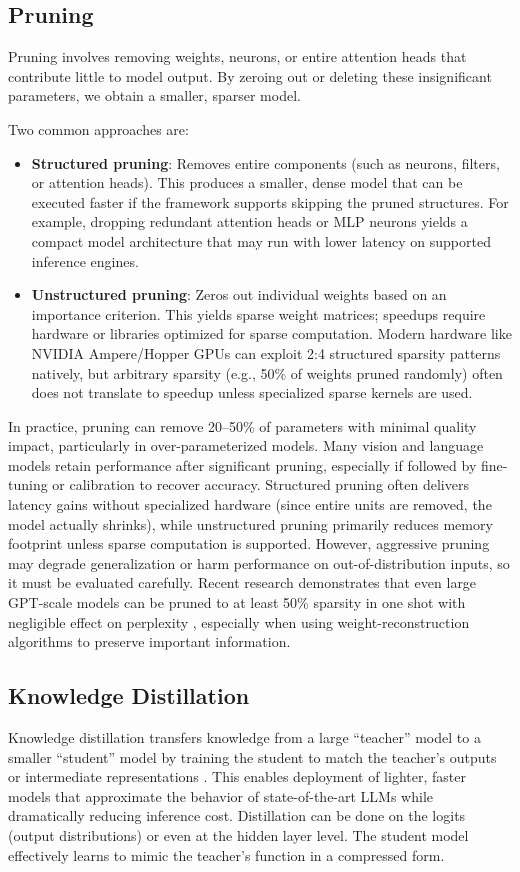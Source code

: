 \subsection{Pruning}
Pruning involves removing weights, neurons, or entire attention heads that contribute little to model output. By zeroing out or deleting these insignificant parameters, we obtain a smaller, sparser model.

Two common approaches are:
\begin{itemize}
    \item \textbf{Structured pruning}: Removes entire components (such as neurons, filters, or attention heads). This produces a smaller, dense model that can be executed faster if the framework supports skipping the pruned structures. For example, dropping redundant attention heads or MLP neurons yields a compact model architecture that may run with lower latency on supported inference engines.
    \item \textbf{Unstructured pruning}: Zeros out individual weights based on an importance criterion. This yields sparse weight matrices; speedups require hardware or libraries optimized for sparse computation. Modern hardware like NVIDIA Ampere/Hopper GPUs can exploit 2:4 structured sparsity patterns natively, but arbitrary sparsity (e.g., 50\% of weights pruned randomly) often does not translate to speedup unless specialized sparse kernels are used.
\end{itemize}

In practice, pruning can remove 20--50\% of parameters with minimal quality impact, particularly in over-parameterized models. Many vision and language models retain performance after significant pruning, especially if followed by fine-tuning or calibration to recover accuracy. Structured pruning often delivers latency gains without specialized hardware (since entire units are removed, the model actually shrinks), while unstructured pruning primarily reduces memory footprint unless sparse computation is supported. However, aggressive pruning may degrade generalization or harm performance on out-of-distribution inputs, so it must be evaluated carefully. Recent research demonstrates that even large GPT-scale models can be pruned to at least 50\% sparsity in one shot with negligible effect on perplexity \cite{Frantar2023SparseGPT}, especially when using weight-reconstruction algorithms to preserve important information.

\subsection{Knowledge Distillation}
Knowledge distillation transfers knowledge from a large ``teacher'' model to a smaller ``student'' model by training the student to match the teacher's outputs or intermediate representations \cite{Hinton2015Distillation}. This enables deployment of lighter, faster models that approximate the behavior of state-of-the-art LLMs while dramatically reducing inference cost. Distillation can be done on the logits (output distributions) or even at the hidden layer level. The student model effectively learns to mimic the teacher’s function in a compressed form.

